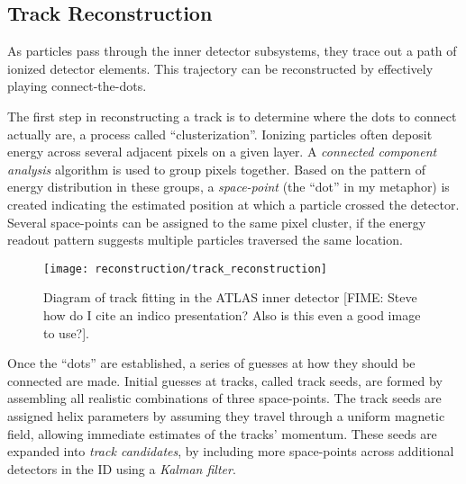         \FloatBarrier
        \subsection{Track Reconstruction}

            As particles pass through the inner detector subsystems, they trace out a path of ionized detector elements.
            This trajectory can be reconstructed by effectively playing connect-the-dots.

            The first step in reconstructing a track is to determine where the dots to connect actually are, 
                a process called ``clusterization''.
            Ionizing particles often deposit energy across several adjacent pixels on a given layer.
            A \textit{connected component analysis} algorithm is used to group pixels together.
            Based on the pattern of energy distribution in these groups,
                a \textit{space-point} (the ``dot'' in my metaphor) 
                is created indicating the estimated position at which a particle crossed the detector.
            Several space-points can be assigned to the same pixel cluster,
                if the energy readout pattern suggests multiple particles traversed the same location.

            \begin{figure}[tbh]
                \texttt{[image: reconstruction/track\_reconstruction]}
                \caption{
                    Diagram of track fitting in the ATLAS inner detector
                    [FIME: Steve how do I cite an indico presentation? Also is this even a good image to use?].
                }
                \label{fig:atlas_shower}
            \end{figure}


            Once the ``dots'' are established, a series of guesses at how they should be connected are made.
            Initial guesses at tracks, called track seeds, are formed by assembling all realistic combinations of three space-points.
            The track seeds are assigned helix parameters by assuming they travel through a uniform magnetic field,
                allowing immediate estimates of the tracks' momentum.
            These seeds are expanded into \textit{track candidates},
                by including more space-points across additional detectors in the ID using a \textit{Kalman filter}.

